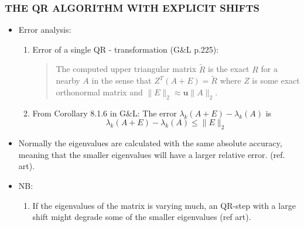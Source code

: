 \documentclass[a4paper,8pt]{beamer} %
\newcommand{\ts}[1]{\textbf{#1}}
\newcommand{\norm}[1]{\lVert{#1}\rVert}
\begin{document}
\begin{frame}  %
\frametitle{THE QR ALGORITHM WITH EXPLICIT SHIFTS}
\begin{itemize}
	\item Error analysis:
		\begin{enumerate}
			\item Error of a single QR - transformation
				(G\&L p.225):\\
				\begin{quote}
					The computed upper triangular matrix $\tilde R$ is the exact $R$ for a nearby $A$
					in the sense that $Z^T(A+E)=\tilde R$ where $Z$ is some exact orthonormal matrix
					and $\norm{E}_2\approx\ts u\norm{A}_2$.
				\end{quote}
			\item From Corollary 8.1.6 in G\&L: The error $\lambda_k(A+E)-\lambda_k(A)$ is
				\begin{equation}
					\lambda_k(A+E)-\lambda_k(A) \le \norm{E}_2 
				\end{equation}
		\end{enumerate}
	\item Normally the eigenvalues are calculated with the same absolute accuracy, meaning that the 
			smaller eigenvalues will have a larger relative error. (ref. art).
	\item NB:
		\begin{enumerate}
			\item If the eigenvalues of the matrix is varying much, an QR-step with a large shift 
				might degrade some of the smaller eigenvalues (ref art).
		\end{enumerate}
\end{itemize}
\end{frame} %
\end{document}
